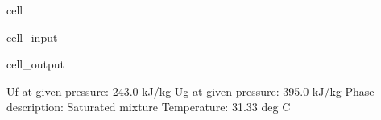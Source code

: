 \documentclass[letterpaper,10pt,english]{jupyterBook}
\begin{document}
\begin{sphinxuseclass}{cell}
\begin{sphinxVerbatimInput}
\begin{sphinxuseclass}{cell_input}
\end{sphinxuseclass}\end{sphinxVerbatimInput}
\begin{sphinxVerbatimOutput}

\begin{sphinxuseclass}{cell_output}
\begin{sphinxVerbatim}[commandchars=\\\{\}]
Uf at given pressure: 243.0 kJ/kg
Ug at given pressure: 395.0 kJ/kg
Phase description: Saturated mixture
Temperature: 31.33 deg C
\end{sphinxVerbatim}

\end{sphinxuseclass}\end{sphinxVerbatimOutput}

\end{sphinxuseclass}
\end{document}
